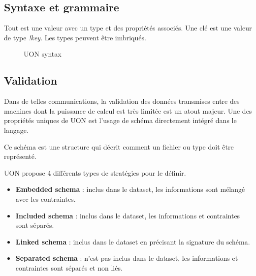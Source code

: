 \documentclass[
    iict, %
    il, %
]{heig-tb}
\begin{document}
\subsection{Syntaxe et grammaire}

Tout est une valeur avec un type et des propriétés associés. Une clé est une valeur de type \emph{!key}. Les types peuvent être imbriqués.

\begin{figure}[H]
    \begin{center}
    \end{center}
    \caption[Règle de syntaxe en UON]{\label{syntax} UON syntax}
\end{figure}

\subsection{Validation}
Dans de telles communications, la validation des données transmises entre des machines dont la puissance de calcul est très limitée est un atout majeur.
Une des propriétés uniques de UON est l'usage de schéma directement intégré dans le langage.

Ce schéma est une structure qui décrit comment un fichier ou type doit être représenté.

UON propose 4 différents types de stratégies pour le définir.

\begin{itemize}
    \item \textbf{Embedded schema} : inclus dans le dataset, les informations sont mélangé avec les contraintes.
    \item \textbf{Included schema} : inclus dans le dataset, les informations et contraintes sont séparés.
    \item \textbf{Linked schema} : inclus dans le dataset en précisant la signature du schéma.
    \item \textbf{Separated schema} : n'est pas inclus dans le dataset, les informations et contraintes sont séparés et non liés.
\end{itemize}
\end{document}
